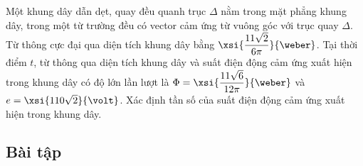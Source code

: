 \begin{vd}
	Một khung dây dẫn dẹt, quay đều quanh trục $\Delta$ nằm trong mặt phẳng khung dây, trong một từ trường đều có vector cảm ứng từ vuông góc với trục quay $\Delta$. Từ thông cực đại qua diện tích khung dây bằng $\xsi{\dfrac{11\sqrt{2}}{6\pi}}{\weber}$. Tại thời điểm $t$, từ thông qua diện tích khung dây và suất điện động cảm ứng xuất hiện trong khung dây có độ lớn lần lượt là $\Phi=\xsi{\dfrac{11\sqrt{6}}{12\pi}}{\weber}$ và $e=\xsi{110\sqrt{2}}{\volt}$. Xác định tần số của suất điện động cảm ứng xuất hiện trong khung dây.
\end{vd}
\subsection{Bài tập}
